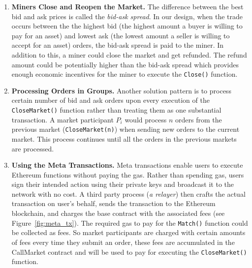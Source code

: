 \begin{enumerate}


\item \textbf {Miners Close and Reopen the Market.} The difference between the best bid and ask prices is called the \textit{bid-ask spread}. In our design, when the trade occurs between the the highest bid (the highest amount a buyer is willing to pay for an asset) and lowest ask (the lowest amount a seller is willing to accept for an asset) orders, the bid-ask spread is paid to the miner. In addition to this, a miner could close the market and get refunded. The refund amount could be potentially higher than the bid-ask spread which provides enough economic incentives for the miner to execute the \texttt{Close()} function.



\item \textbf{Processing Orders in Groups.} Another solution pattern is to process certain number of bid and ask orders upon every execution of the \texttt{CloseMarket()} function rather than treating them as one substantial transaction. A market participant $P_i$ would process $n$ orders from the previous market (\texttt{CloseMarket(n)}) when sending new orders to the current market. This process continues until all the orders in the previous markets are processed. %
 




\item \textbf {Using the Meta Transactions.} Meta transactions enable users to execute Ethereum functions without paying the gas. Rather than spending gas, users sign their intended action using their private keys and broadcast it to the network with no cost. A third party process (\textit{a relayer}) then crafts the actual transaction on user's behalf, sends the transaction to the Ethereum blockchain, and charges the base contract with the associated fees (see Figure~\ref{fig:meta_tx}). The required gas to pay for the \texttt{Match()} function could be collected as fees. So market participants are charged with certain amounts of fees every time they submit an order, these fees are accumulated in the CallMarket contract and will be used to pay for executing the \texttt{CloseMarket()} function.


\end{enumerate}

